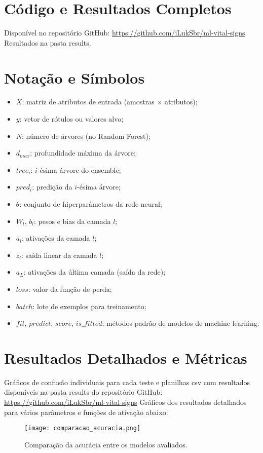 \documentclass[11pt]{article}
\begin{document}
\section{Código e Resultados Completos}
Disponível no repositório GitHub: \url{https://github.com/iLukSbr/ml-vital-signs}
Resultados na pasta results.

\section{Notação e Símbolos}
\begin{itemize}
    \item $X$: matriz de atributos de entrada (amostras $\times$ atributos);
    \item $y$: vetor de rótulos ou valores alvo;
    \item $N$: número de árvores (no Random Forest);
    \item $d_{max}$: profundidade máxima da árvore;
    \item $tree_i$: $i$-ésima árvore do ensemble;
    \item $pred_i$: predição da $i$-ésima árvore;
    \item $\theta$: conjunto de hiperparâmetros da rede neural;
    \item $W_l$, $b_l$: pesos e bias da camada $l$;
    \item $a_l$: ativações da camada $l$;
    \item $z_l$: saída linear da camada $l$;
    \item $a_L$: ativações da última camada (saída da rede);
    \item $loss$: valor da função de perda;
    \item $batch$: lote de exemplos para treinamento;
    \item $fit$, $predict$, $score$, $is\_fitted$: métodos padrão de modelos de machine learning.
\end{itemize}

\section{Resultados Detalhados e Métricas}
Gráficos de confusão individuais para cada teste e planilhas csv com resultados disponíveis na pasta results do repositório GitHub: \url{https://github.com/iLukSbr/ml-vital-signs}
Gráficos dos resultados detalhados para vários parâmetros e funções de ativação abaixo:

\begin{figure}[ht]
\centering
\texttt{[image: comparacao\_acuracia.png]}
\caption{Comparação da acurácia entre os modelos avaliados.}
\label{fig:comparacao_acuracia}
\end{figure}
\end{document}

